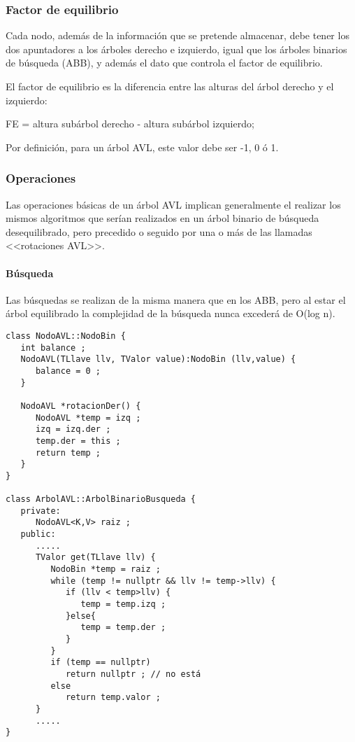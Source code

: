 \subsubsection{Factor de equilibrio}
\label{sec:factor-de-equilibrio}

Cada nodo, además de la información que se pretende almacenar, debe
tener los dos apuntadores a los árboles derecho e izquierdo, igual que
los árboles binarios de búsqueda (ABB), y además el dato que controla
el factor de equilibrio.

El factor de equilibrio es la diferencia entre las alturas del árbol
derecho y el izquierdo:

FE = altura subárbol derecho - altura subárbol izquierdo;

Por definición, para un árbol AVL, este valor debe ser -1, 0 ó 1.

\subsubsection{Operaciones}
\label{sec:operaciones}

Las operaciones básicas de un árbol AVL implican generalmente el
realizar los mismos algoritmos que serían realizados en un árbol
binario de búsqueda desequilibrado, pero precedido o seguido por una o
más de las llamadas <<rotaciones AVL>>.

\paragraph{Búsqueda}
\label{sec:busqueda-1}

Las búsquedas se realizan de la misma manera que en los ABB, pero al
estar el árbol equilibrado la complejidad de la búsqueda nunca
excederá de O(log n).

\begin{verbatim}
class NodoAVL::NodoBin {
   int balance ;
   NodoAVL(TLlave llv, TValor value):NodoBin (llv,value) {
      balance = 0 ;
   }

   NodoAVL *rotacionDer() {
      NodoAVL *temp = izq ;
      izq = izq.der ;
      temp.der = this ;
      return temp ;
   }
}

class ArbolAVL::ArbolBinarioBusqueda {
   private:
      NodoAVL<K,V> raiz ;
   public:
      .....
      TValor get(TLlave llv) {
         NodoBin *temp = raiz ;
         while (temp != nullptr && llv != temp->llv) {
            if (llv < temp>llv) {
               temp = temp.izq ;
            }else{
               temp = temp.der ;
            }
         }
         if (temp == nullptr)
            return nullptr ; // no está
         else
            return temp.valor ;
      }
      .....
}
\end{verbatim}


